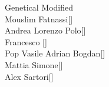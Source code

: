 \begin{center}
\begin{multicols}{2}
    \columnbreak
 
    \Large{Genetical Modified\\

    \vspace{1 cm}
    Mouslim Fatnassi[]\\
    Andrea Lorenzo Polo[]\\
    Francesco []\\
    Pop Vasile Adrian Bogdan[]\\
    Mattia Simone[]\\
    Alex Sartori[]\\}
  \end{multicols}
  
  
\end{center}

